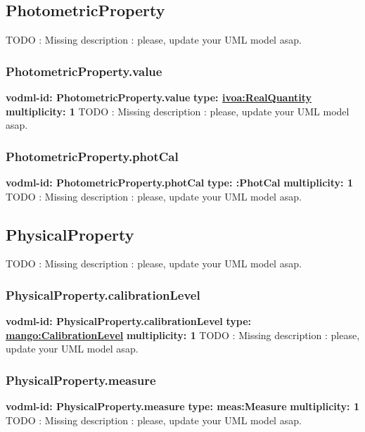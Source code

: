   \subsection{PhotometricProperty}
  \label{sect:PhotometricProperty}
    TODO : Missing description : please, update your UML model asap.

    \subsubsection{PhotometricProperty.value}
      \textbf{vodml-id: PhotometricProperty.value} \newline
      \textbf{type: \hyperref[sect:ivoa]{ivoa:RealQuantity}} \newline
      \textbf{multiplicity: 1} \newline 
      TODO : Missing description : please, update your UML model asap.

    \subsubsection{PhotometricProperty.photCal}
      \textbf{vodml-id: PhotometricProperty.photCal} \newline
      \textbf{type: :PhotCal} \newline
      \textbf{multiplicity: 1} \newline 
      TODO : Missing description : please, update your UML model asap.

  \subsection{PhysicalProperty}
  \label{sect:PhysicalProperty}
    TODO : Missing description : please, update your UML model asap.

    \subsubsection{PhysicalProperty.calibrationLevel}
      \textbf{vodml-id: PhysicalProperty.calibrationLevel} \newline
      \textbf{type: \hyperref[sect:CalibrationLevel]{mango:CalibrationLevel}} \newline
      \textbf{multiplicity: 1} \newline 
      TODO : Missing description : please, update your UML model asap.

    \subsubsection{PhysicalProperty.measure}
      \textbf{vodml-id: PhysicalProperty.measure} \newline
      \textbf{type: meas:Measure} \newline
      \textbf{multiplicity: 1} \newline 
      TODO : Missing description : please, update your UML model asap.

